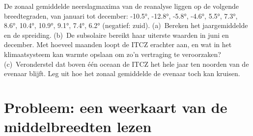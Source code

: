 \begin{exercise}[$\star\star\star$]\label{exo:b1:atmospheric-circulation:12}
De zonaal gemiddelde neerslagmaxima van de reanalyse liggen op de volgende
breedtegraden, van januari tot december: \ang{-10.5}, \ang{-12.8}, \ang{-5.8}, \ang{-4.6}, \ang{5.5},
\ang{7.3}, \ang{8.6}, \ang{10.4}, \ang{10.9}, \ang{9.1}, \ang{7.4}, \ang{6.2}
(negatief: zuid). (a)~Bereken het jaargemiddelde en de spreiding. (b)~De subsolaire  bereikt haar uiterste waarden in juni en december. Met hoeveel maanden loopt de ITCZ erachter aan, en wat in het klimaatsysteem kan warmte opslaan om zo'n vertraging te veroorzaken? (c)~Veronderstel dat boven één oceaan de ITCZ het hele jaar ten noorden van de evenaar blijft. Leg uit hoe het zonaal gemiddelde de evenaar toch kan kruisen.
\end{exercise}

\section{Probleem: een weerkaart van de middelbreedten lezen}

